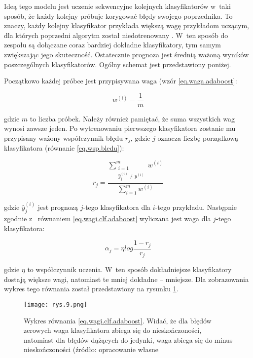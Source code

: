 Ideą tego modelu jest uczenie sekwencyjne kolejnych klasyfikatorów w~taki sposób, że każdy kolejny próbuje korygować błędy swojego poprzednika. To znaczy, każdy kolejny klasyfikator przykłada większą wagę przykładom uczącym, dla których poprzedni algorytm został niedotrenowany \cite{Sawka18}. W~ten sposób do zespołu są dołączane coraz bardziej dokładne klasyfikatory, tym samym zwiększając jego skuteczność. Ostatecznie prognoza jest średnią ważoną wyników poszczególnych klasyfikatorów. Ogólny schemat jest przedstawiony poniżej.

Początkowo każdej próbce jest przypisywana waga (wzór \ref{eq.waga.adaboost}:

\begin{equation}
\label{eq.waga.adaboost}
	w^{(i)}=\frac 1 m
\end{equation}

\noindent gdzie $m$ to liczba próbek. Należy również pamiętać, że suma wszystkich wag wynosi zawsze jeden. Po wytrenowaniu pierwszego klasyfikatora zostanie mu przypisany ważony współczynnik błędu $r_j$, gdzie $j$ oznacza liczbę porządkową klasyfikatora (równanie \ref{eq.wsp.bledu}):

\begin{equation}
\label{eq.wsp.bledu}
	r_j = \frac { \sum\limits_{\substack{i=1 \\ \hat y_j^{(i)} \neq y^{(i)}}}^{m} w^{(i)}}{{\sum\limits_{i=1}^{m} w^{(i)}}}
\end{equation}

\noindent gdzie $\hat y_j^{(i)}$ jest prognozą $j$-tego klasyfikatora dla $i$-tego przykładu. Następnie zgodnie z~ równaniem \ref{eq.wagi.clf.adaboost} wyliczana jest waga dla $j$-tego klasyfikatora:

\begin{equation}
\label{eq.wagi.clf.adaboost}
	\alpha_j=\eta log\frac {1-r_j} {r_j}
\end{equation}

\noindent gdzie $\eta$ to współczynnik uczenia. W~ten sposób dokładniejsze klasyfikatory dostają 
większe wagi, natomiast te mniej dokładne – mniejsze. Dla zobrazowania wykres tego równania został przedstawiony na rysunku \ref{fig:mesh9}.

\begin{figure}[h]
    \centering
    \texttt{[image: rys.9.png]}
    \caption{Wykres równania \ref{eq.wagi.clf.adaboost}. Widać, że dla błędów zerowych waga klasyfikatora zbiega się do nieskończoności, natomiast dla błędów dążących do jedynki, waga zbiega się do minus nieskończoności (źródło: opracowanie własne}
    \label{fig:mesh9}
\end{figure}

